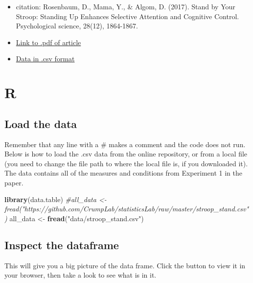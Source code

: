 \documentclass[]{book}
\newenvironment{Shaded}{\begin{snugshade}}{\end{snugshade}}
\newcommand{\KeywordTok}[1]{\textcolor[rgb]{0.13,0.29,0.53}{\textbf{{#1}}}}
\newcommand{\StringTok}[1]{\textcolor[rgb]{0.31,0.60,0.02}{{#1}}}
\newcommand{\CommentTok}[1]{\textcolor[rgb]{0.56,0.35,0.01}{\textit{{#1}}}}
\newcommand{\NormalTok}[1]{{#1}}
\providecommand{\tightlist}{%
  \setlength{\itemsep}{0pt}\setlength{\parskip}{0pt}}
\theoremstyle{definition}
\theoremstyle{definition}
\theoremstyle{definition}
\theoremstyle{remark}
\begin{document}
\begin{itemize}
\tightlist
\item
  citation: Rosenbaum, D., Mama, Y., \& Algom, D. (2017). Stand by Your
  Stroop: Standing Up Enhances Selective Attention and Cognitive
  Control. Psychological science, 28(12), 1864-1867.
\item
  \href{https://www.researchgate.net/profile/David_Rosenbaum6/publication/320070495_Stand_by_Your_Stroop_Standing_Up_Enhances_Selective_Attention_and_Cognitive_Control/links/5a82b4f10f7e9bda869fac5b/Stand-by-Your-Stroop-Standing-Up-Enhances-Selective-Attention-and-Cognitive-Control.pdf}{Link
  to .pdf of article}
\item
  \href{https://github.com/CrumpLab/statisticsLab/raw/master/stroop_stand.csv}{Data
  in .csv format}
\end{itemize}

\section{R}\label{r-10}

\subsection{Load the data}\label{load-the-data-4}

Remember that any line with a \# makes a comment and the code does not
run. Below is how to load the .csv data from the online repository, or
from a local file (you need to change the file path to where the local
file is, if you downloaded it). The data contains all of the measures
and conditions from Experiment 1 in the paper.

\begin{Shaded}
\begin{Highlighting}[]
\KeywordTok{library}\NormalTok{(data.table)}
\CommentTok{#all_data <- fread("https://github.com/CrumpLab/statisticsLab/raw/master/stroop_stand.csv")}
\NormalTok{all_data <-}\StringTok{ }\KeywordTok{fread}\NormalTok{(}\StringTok{"data/stroop_stand.csv"}\NormalTok{)}
\end{Highlighting}
\end{Shaded}

\subsection{Inspect the dataframe}\label{inspect-the-dataframe-2}

This will give you a big picture of the data frame. Click the button to
view it in your browser, then take a look to see what is in it.
\end{document}
